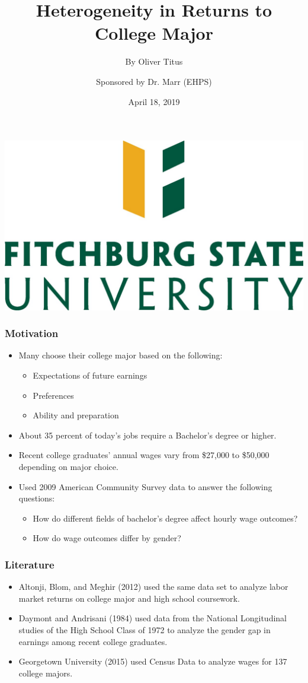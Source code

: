 \documentclass[12pt]{beamer}
\title{Heterogeneity in Returns to College Major}
\author{By Oliver Titus \\
\and Sponsored by Dr. Marr (EHPS)}
\date{April 18, 2019}
\begin{document}
\begin{frame}
\titlepage
\includegraphics[scale=0.1]{logo.jpg}
\end{frame}

\begin{frame}
\frametitle{Motivation}
\begin{itemize}
\item Many choose their college major based on the following:
\begin{itemize}
\item Expectations of future earnings
\item Preferences
\item Ability and preparation
\end{itemize}
\item About 35 percent of today's jobs require a Bachelor's degree or higher.
\item Recent college graduates' annual wages vary from \$27,000 to \$50,000 depending on major choice.
\item Used 2009 American Community Survey data to answer the following questions:
\begin{itemize}
\item How do different fields of bachelor's degree affect hourly wage outcomes?
\item How do wage outcomes differ by gender?
\end{itemize}
\end{itemize}
\end{frame}

\begin{frame}
\frametitle{Literature}
\begin{itemize}
\item Altonji, Blom, and Meghir (2012) used the same data set to analyze labor market returns on college major and high school coursework.
\item Daymont and Andrisani (1984) used data from the National Longitudinal studies of the High School Class of 1972 to analyze the gender gap in earnings among recent college graduates.
\item Georgetown University (2015) used Census Data to analyze wages for 137 college majors.
\end{itemize}
\end{frame}
\end{document}
